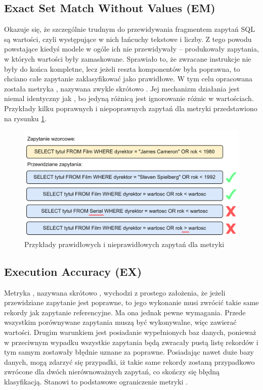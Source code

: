 \subsection{Exact Set Match Without Values (EM)}
Okazuje się, że szczególnie trudnym do przewidywania fragmentem zapytań SQL są wartości, czyli występujące w nich łańcuchy tekstowe i liczby. Z tego powodu powstające kiedyś modele w ogóle ich nie przewidywały -- produkowały zapytania, w których wartości były zamaskowane. Sprawiało to, że zwracane instrukcje nie były do końca kompletne, lecz jeżeli reszta komponentów była poprawna, to chciano całe zapytanie zaklasyfikować jako prawidłowe. W tym celu opracowana została metryka , nazywana zwykle skrótowo . Jej mechanizm działania jest niemal identyczny jak , bo jedyną różnicą jest ignorowanie różnic w wartościach. Przykłady kilku poprawnych i niepoprawnych zapytań dla metryki  przedstawiono na rysunku \ref{fig:em-without-values}.

\begin{figure}[ht!]
  \centering
  \includegraphics[width=0.85\linewidth]{images/em_without_values.png}
  \caption{Przykłady prawidłowych i nieprawidłowych zapytań dla metryki }
  \label{fig:em-without-values}
\end{figure}

\subsection{Execution Accuracy (EX)}
\label{text:execution_accuracy}
Metryka , nazywana skrótowo , wychodzi z prostego założenia, że jeżeli przewidziane zapytanie jest poprawne, to jego wykonanie musi zwrócić takie same rekordy jak zapytanie referencyjne. Ma ona jednak pewne wymagania. Przede wszystkim porównywane zapytania muszą być wykonywalne, więc zawierać wartości. Drugim warunkiem jest posiadanie wypełnionych baz danych, ponieważ w przeciwnym wypadku wszystkie zapytania będą zwracały pustą listę rekordów i tym samym zostawały błędnie uznane za poprawne. Posiadając nawet duże bazy danych, mogą zdarzyć się przypadki, iż takie same rekordy zostaną przypadkowo zwrócone dla dwóch nierównoważnych zapytań, co skończy się błędną klasyfikacją. Stanowi to podstawowe ograniczenie metryki .

